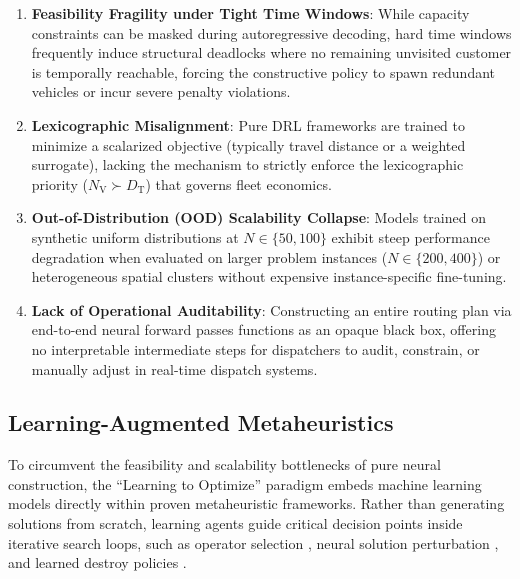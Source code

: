 \documentclass{ieeeaccess}
\newcommand{\NV}{{N_\mathrm{V}}}
\newcommand{\TD}{{D_\mathrm{T}}}
\begin{document}
\begin{enumerate}
    \item \textbf{Feasibility Fragility under Tight Time Windows}: While capacity
    constraints can be masked during autoregressive decoding, hard time windows
    frequently induce structural deadlocks where no remaining unvisited customer
    is temporally reachable, forcing the constructive policy to spawn redundant
    vehicles or incur severe penalty violations.
    \item \textbf{Lexicographic Misalignment}: Pure DRL frameworks are trained
    to minimize a scalarized objective (typically travel distance or a
    weighted surrogate), lacking the mechanism to strictly enforce the
    lexicographic priority ($\NV \succ \TD$) that governs fleet economics.
    \item \textbf{Out-of-Distribution (OOD) Scalability Collapse}: Models trained
    on synthetic uniform distributions at $N \in \{50, 100\}$ exhibit steep
    performance degradation when evaluated on larger problem instances
    ($N \in \{200, 400\}$) or heterogeneous spatial clusters without expensive
    instance-specific fine-tuning.
    \item \textbf{Lack of Operational Auditability}: Constructing an entire routing
    plan via end-to-end neural forward passes functions as an opaque black box,
    offering no interpretable intermediate steps for dispatchers to audit,
    constrain, or manually adjust in real-time dispatch systems.
\end{enumerate}

\subsection{Learning-Augmented Metaheuristics}
\label{sec:rw_hybrid}

To circumvent the feasibility and scalability bottlenecks of pure neural construction, the ``Learning to Optimize'' paradigm \cite{bengio2021machine} embeds machine learning models directly within proven metaheuristic frameworks. Rather than generating solutions from scratch, learning agents guide critical decision points inside iterative search loops, such as operator selection \cite{syberfeldt2009reinforcement, lu2020learning}, neural solution perturbation \cite{chen2019learning}, and learned destroy policies \cite{hottung2020neural, son2023learning}.
\end{document}
